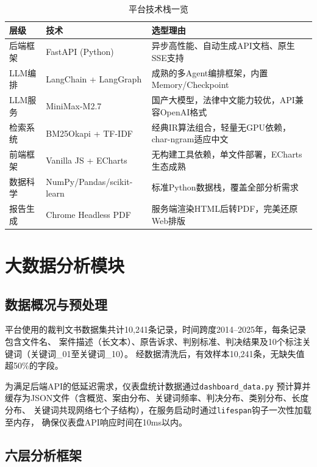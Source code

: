 \documentclass[12pt,a4paper,twoside]{ctexart}
\begin{document}
\begin{table}[H]
\centering
\caption{平台技术栈一览}
\label{tab:techstack}
\begin{tabular}{@{}lll@{}}
\toprule
\textbf{层级} & \textbf{技术} & \textbf{选型理由} \\
\midrule
后端框架   & FastAPI (Python)           & 异步高性能、自动生成API文档、原生SSE支持 \\
LLM编排   & LangChain + LangGraph      & 成熟的多Agent编排框架，内置Memory/Checkpoint \\
LLM服务   & MiniMax-M2.7              & 国产大模型，法律中文能力较优，API兼容OpenAI格式 \\
检索系统   & BM25Okapi + TF-IDF        & 经典IR算法组合，轻量无GPU依赖，char-ngram适应中文 \\
前端框架   & Vanilla JS + ECharts      & 无构建工具依赖，单文件部署，ECharts生态成熟 \\
数据科学   & NumPy/Pandas/scikit-learn & 标准Python数据栈，覆盖全部分析需求 \\
报告生成   & Chrome Headless PDF       & 服务端渲染HTML后转PDF，完美还原Web排版 \\
\bottomrule
\end{tabular}
\end{table}

\section{大数据分析模块}

\subsection{数据概况与预处理}

平台使用的裁判文书数据集共计10,241条记录，时间跨度2014--2025年，每条记录包含文件名、
案件描述（长文本）、原告诉求、判别标准、判决结果及10个标注关键词（关键词\_01至关键词\_10）。
经数据清洗后，有效样本10,241条，无缺失值超50\%的字段。

为满足后端API的低延迟需求，仪表盘统计数据通过\texttt{dashboard\_data.py}
预计算并缓存为JSON文件（含概览、案由分布、关键词频率、判决分布、类别分布、长度分布、
关键词共现网络七个子结构），在服务启动时通过\texttt{lifespan}钩子一次性加载至内存，
确保仪表盘API响应时间在10ms以内。

\subsection{六层分析框架}
\end{document}
